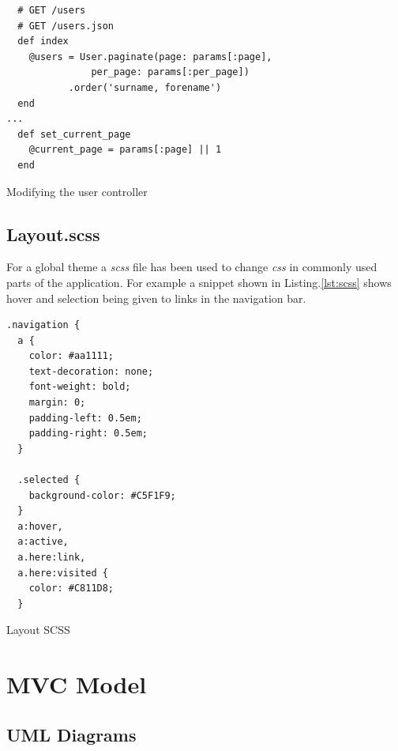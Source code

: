 \documentclass[a4paper]{article}
\begin{document}
\begin{listing}[H]
\begin{verbatim}
  # GET /users
  # GET /users.json
  def index
    @users = User.paginate(page: params[:page],
			   per_page: params[:per_page])
	       .order('surname, forename')
  end
...
  def set_current_page
    @current_page = params[:page] || 1
  end
\end{verbatim}
\caption{\label{lst:pagination}Modifying the user controller}
\end{listing}


\subsection{Layout.scss}
\label{sec-1-6}
For a global theme a \emph{scss} file has been used to change \emph{css} in commonly used parts of the application.
For example a snippet shown in Listing.\ref{lst:scss} shows hover and selection being given to links 
in the navigation bar.

\begin{listing}[H]
\begin{verbatim}
.navigation {
  a {
    color: #aa1111;
    text-decoration: none;
    font-weight: bold;
    margin: 0;
    padding-left: 0.5em;
    padding-right: 0.5em;
  }

  .selected {
    background-color: #C5F1F9;
  }
  a:hover,
  a:active,
  a.here:link,
  a.here:visited {
    color: #C811D8;
  }
\end{verbatim}
\caption{\label{lst:scss}Layout SCSS}
\end{listing}

\clearpage
\section{MVC Model}
\label{sec-2}

\subsection{UML Diagrams}
\label{sec-2-1}
\end{document}
